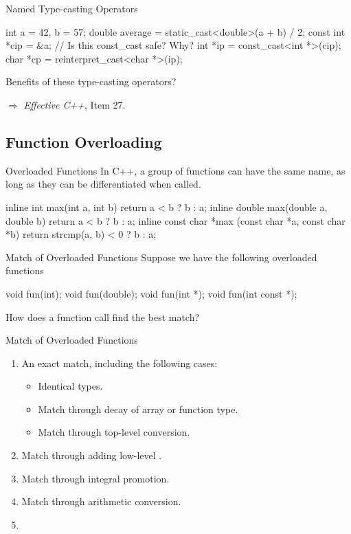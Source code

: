 \documentclass[handout]{beamer}
\begin{document}
\begin{frame}[fragile]{Named Type-casting Operators}
    \begin{cpp}
int a = 42, b = 57;
double average = static_cast<double>(a + b) / 2;
const int *cip = &a;
// Is this const_cast safe? Why?
int *ip = const_cast<int *>(cip);
char *cp = reinterpret_cast<char *>(ip);
    \end{cpp}
    \pause
    \begin{question}
        Benefits of these type-casting operators?
    \end{question}
    \pause
    \(\Rightarrow\) \textit{Effective C++}, Item 27.
\end{frame}

\subsection{Function Overloading}

\begin{frame}[fragile]{Overloaded Functions}
    In C++, a group of functions can have the same name, as long as they can be differentiated when called.
    \begin{cpp}
inline int max(int a, int b) {
  return a < b ? b : a;
}
inline double max(double a, double b) {
  return a < b ? b : a;
}
inline const char *max
    (const char *a, const char *b) {
  return strcmp(a, b) < 0 ? b : a;
}
    \end{cpp}
\end{frame}

\begin{frame}[fragile]{Match of Overloaded Functions}
    Suppose we have the following overloaded functions
    \begin{cpp}
void fun(int);
void fun(double);
void fun(int *);
void fun(int const *);
    \end{cpp}
    How does a function call find the best match?
\end{frame}

\begin{frame}{Match of Overloaded Functions}
    \begin{enumerate}
        \item An exact match, including the following cases:
        \begin{itemize}
            \item Identical types.
            \item Match through decay of array or function type.
            \item Match through top-level  conversion.
        \end{itemize}
        \item Match through adding low-level .
        \item Match through integral promotion.
        \item Match through arithmetic conversion.
        \item {}
    \end{enumerate}
\end{frame}
\end{document}
